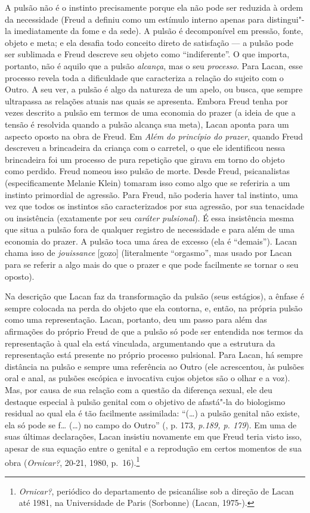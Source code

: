 A pulsão não é o instinto precisamente porque ela não pode ser reduzida
à ordem da necessidade (Freud a definiu como um estímulo interno apenas
para distingui"-la imediatamente da fome e da sede). A pulsão é
decomponível em pressão, fonte, objeto e meta; e ela desafia todo
conceito direto de satisfação --- a pulsão pode ser sublimada e Freud
descreve seu objeto como ``indiferente''. O que importa, portanto, não é
aquilo que a pulsão \emph{alcança}, mas o seu \emph{processo}. Para
Lacan, esse processo revela toda a dificuldade que caracteriza a relação
do sujeito com o Outro. A seu ver, a pulsão é algo da natureza de um
apelo, ou busca, que sempre ultrapassa as relações atuais nas quais se
apresenta. Embora Freud tenha por vezes descrito a pulsão em termos de
uma economia do prazer (a ideia de que a tensão é resolvida quando a
pulsão alcança sua meta), Lacan aponta para um aspecto oposto na obra de
Freud. Em \emph{Além do princípio do prazer}, quando Freud descreveu a
brincadeira da criança com o carretel, o que ele identificou nessa
brincadeira foi um processo de pura repetição que girava em torno do
objeto como perdido. Freud nomeou isso pulsão de morte. Desde Freud,
psicanalistas (especificamente Melanie Klein) tomaram isso como algo que
se referiria a um instinto primordial de agressão. Para Freud, não
poderia haver tal instinto, uma vez que todos os instintos são
caracterizados por sua agressão, por sua tenacidade ou insistência
(exatamente por seu \emph{caráter pulsional}). É essa insistência mesma
que situa a pulsão fora de qualquer registro de necessidade e para além
de uma economia do prazer. A pulsão toca uma área de excesso (ela é
``demais''). Lacan chama isso de \emph{jouissance} {[}gozo{]}
(literalmente ``orgasmo'', mas usado por Lacan para se referir a algo
mais do que o prazer e que pode facilmente se tornar o seu oposto).

Na descrição que Lacan faz da transformação da pulsão (seus estágios), a
ênfase é sempre colocada na perda do objeto que ela contorna, e, então,
na própria pulsão como uma representação. Lacan, portanto, deu um passo
para além das afirmações do próprio Freud de que a pulsão só pode ser
entendida nos termos da representação à qual ela está vinculada,
argumentando que a estrutura da representação está presente no próprio
processo pulsional. Para Lacan, há sempre distância na pulsão e sempre
uma referência ao Outro (ele acrescentou, às pulsões oral e anal, as
pulsões escópica e invocativa cujos objetos são o olhar e a voz). Mas,
por causa de sua relação com a questão da diferença sexual, ele deu
destaque especial à pulsão genital com o objetivo de afastá"-la do
biologismo residual ao qual ela é tão facilmente assimilada: ``(\ldots{}) a
pulsão genital não existe, ela só pode se f\ldots{} (\ldots{}) no campo do Outro''
(, p. 173, \emph{p.189, p. 179}). Em uma de suas últimas declarações,
Lacan insistiu novamente em que Freud teria visto isso, apesar de sua
equação entre o genital e a reprodução em certos momentos de sua obra
(\emph{Ornicar?}, 20-21, 1980, p.~16).\footnote{\emph{Ornicar?},
  periódico do departamento de psicanálise sob a direção de Lacan até
  1981, na Universidade de Paris  (Sorbonne) (Lacan, 1975-).} %

